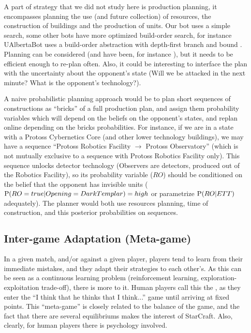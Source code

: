 A part of strategy that we did not study here is production planning, it encompasses planning the use (and future collection) of resources, the construction of buildings and the production of units. Our bot uses a simple search, some other bots have more optimized build-order search, for instance UAlbertaBot uses a build-order abstraction with depth-first branch and bound \citep{Churchill2011}. Planning can be considered (and have been, for instance \citep{BartheyeJ09}), but it needs to be efficient enough to re-plan often. Also, it could be interesting to interface the plan with the uncertainty about the opponent's state (Will we be attacked in the next minute? What is the opponent's technology?). 

A naive probabilistic planning approach would be to plan short sequences of constructions as ``bricks'' of a full production plan, and assign them probability variables which will depend on the beliefs on the opponent's states, and replan online depending on the bricks probabilities. For instance, if we are in a state with a Protoss Cybernetics Core (and other lower technology buildings), we may have a sequence ``Protoss Robotics Facility $\rightarrow$ Protoss Observatory'' (which is not mutually exclusive to a sequence with Protoss Robotics Facility only). This sequence unlocks detector technology (Observers are detectors, produced out of the Robotics Facility), so its probability variable ($RO$) should be conditioned on the belief that the opponent has invisible units ($\mathrm{P}(RO=true|Opening=DarkTemplar)=high$ or parametrize $\mathrm{P}(RO|ETT)$ adequately). The planner would both use resources planning, time of construction, and this posterior probabilities on sequences.

\subsection{Inter-game Adaptation (Meta-game)}


In a given match, and/or against a given player, players tend to learn from their immediate mistakes, and they adapt their strategies to each other's. As this can be seen as a continuous learning problem (reinforcement learning, exploration-exploitation trade-off), there is more to it. Human players call this the \textit{}, as they enter the ``I think that he thinks that I think...'' game until arriving at fixed points. This ``meta-game'' is closely related to the balance of the game, and the fact that there are several equilibriums makes the interest of StarCraft. Also, clearly, for human players there is psychology involved. 

